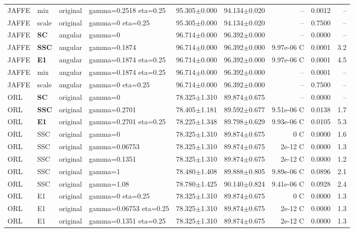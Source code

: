 \begin{longtable}{lllp{.14\linewidth}rrrrr}
JAFFE & mix & original & gamma=0.2518 eta=0.25 & 95.305$\pm$0.000 & 94.134$\pm$0.020 & -- & 0.0012 & --\\
JAFFE & scale & original & gamma=0 eta=0.25 & 95.305$\pm$0.000 & 94.134$\pm$0.020 & -- & 0.7500 & --\\
JAFFE & \textbf{SC} & angular & gamma=0 & 96.714$\pm$0.000 & 96.392$\pm$0.000 & -- & 0.0000 & --\\
JAFFE & \textbf{SSC} & angular & gamma=0.1874 & 96.714$\pm$0.000 & 96.392$\pm$0.000 & 9.97e-06 C & 0.0001 & 3.2\\
JAFFE & \textbf{E1} & angular & gamma=0.1874 eta=0.25 & 96.714$\pm$0.000 & 96.392$\pm$0.000 & 9.97e-06 C & 0.0001 & 4.5\\
JAFFE & mix & angular & gamma=0.1874 eta=0.25 & 96.714$\pm$0.000 & 96.392$\pm$0.000 & -- & 0.0001 & --\\
JAFFE & scale & angular & gamma=0 eta=0.25 & 96.714$\pm$0.000 & 96.392$\pm$0.000 & -- & 0.7500 & --\\
ORL & \textbf{SC} & original & gamma=0 & 78.325$\pm$1.310 & 89.874$\pm$0.675 & -- & 0.0000 & --\\
ORL & \textbf{SSC} & original & gamma=0.2701 & 78.405$\pm$1.181 & 89.592$\pm$0.677 & 9.51e-06 C & 0.0138 & 1.7\\
ORL & \textbf{E1} & original & gamma=0.2701 eta=0.25 & 78.225$\pm$1.348 & 89.798$\pm$0.629 & 9.93e-06 C & 0.0105 & 5.3\\
ORL & SSC & original & gamma=0 & 78.325$\pm$1.310 & 89.874$\pm$0.675 & 0 C & 0.0000 & 1.6\\
ORL & SSC & original & gamma=0.06753 & 78.325$\pm$1.310 & 89.874$\pm$0.675 & 2e-12 C & 0.0000 & 1.3\\
ORL & SSC & original & gamma=0.1351 & 78.325$\pm$1.310 & 89.874$\pm$0.675 & 2e-12 C & 0.0000 & 1.2\\
ORL & SSC & original & gamma=1 & 78.480$\pm$1.408 & 89.888$\pm$0.805 & 9.89e-06 C & 0.0896 & 2.1\\
ORL & SSC & original & gamma=1.08 & 78.780$\pm$1.425 & 90.140$\pm$0.824 & 9.41e-06 C & 0.0928 & 2.4\\
ORL & E1 & original & gamma=0 eta=0.25 & 78.325$\pm$1.310 & 89.874$\pm$0.675 & 0 C & 0.0000 & 1.3\\
ORL & E1 & original & gamma=0.06753 eta=0.25 & 78.325$\pm$1.310 & 89.874$\pm$0.675 & 2e-12 C & 0.0000 & 1.3\\
ORL & E1 & original & gamma=0.1351 eta=0.25 & 78.325$\pm$1.310 & 89.874$\pm$0.675 & 2e-12 C & 0.0000 & 1.3\\

\end{longtable}
